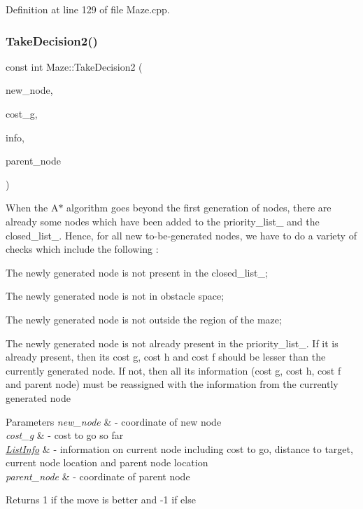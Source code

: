 Definition at line 129 of file Maze.\+cpp.

\mbox{\label{class_maze_a078079ce7e963896360b22651206e13f}} 
\subsubsection{\texorpdfstring{TakeDecision2()}{TakeDecision2()}}
{\footnotesize\ttfamily const int Maze\+::\+Take\+Decision2 (\begin{DoxyParamCaption}\item[{const std\+::pair$<$ int, int $>$ \&}]{new\+\_\+node,  }\item[{const double \&}]{cost\+\_\+g,  }\item[{\mbox{\hyperlink{struct_list_info}{List\+Info}} \&}]{info,  }\item[{const std\+::pair$<$ int, int $>$ \&}]{parent\+\_\+node }\end{DoxyParamCaption})}



When the A$\ast$ algorithm goes beyond the first generation of nodes, there are already some nodes which have been added to the priority\+\_\+list\+\_\+ and the closed\+\_\+list\+\_\+. Hence, for all new to-\/be-\/generated nodes, we have to do a variety of checks which include the following \+: 


\begin{DoxyItemize}
\item The newly generated node is not present in the closed\+\_\+list\+\_\+;
\item The newly generated node is not in obstacle space;
\item The newly generated node is not outside the region of the maze;
\item The newly generated node is not already present in the priority\+\_\+list\+\_\+. If it is already present, then its cost g, cost h and cost f should be lesser than the currently generated node. If not, then all its information (cost g, cost h, cost f and parent node) must be reassigned with the information from the currently generated node 
\begin{DoxyParams}{Parameters}
{\em new\+\_\+node} & -\/ coordinate of new node \\
\hline
{\em cost\+\_\+g} & -\/ cost to go so far \\
\hline
{\em \mbox{\hyperlink{struct_list_info}{List\+Info}}} & -\/ information on current node including cost to go, distance to target, current node location and parent node location \\
\hline
{\em parent\+\_\+node} & -\/ coordinate of parent node \\
\hline
\end{DoxyParams}
\begin{DoxyReturn}{Returns}
1 if the move is better and -\/1 if else 
\end{DoxyReturn}

\end{DoxyItemize}

